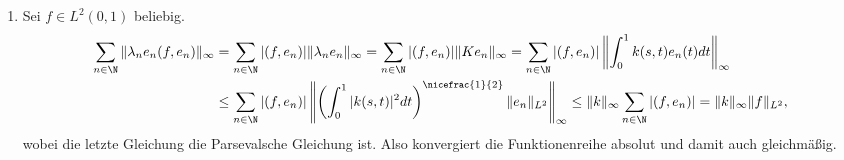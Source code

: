 \begin{solution}
\begin{enumerate}[label = (\alph*)]
  \item Sei $f \in L^2(0,1)$ beliebig.
  \begin{align*}
    \sum_{n \in \N}\|\lambda_n e_n (f,e_n)\|_{\infty} &=
    \sum_{n \in \N}|(f,e_n)|\|\lambda_ne_n\|_{\infty} =
    \sum_{n \in \N}|(f,e_n)|\|Ke_n\|_{\infty} =
    \sum_{n \in \N}|(f,e_n)|\left\|\int_0^1k(s,t)e_n(t)dt\right\|_{\infty} \\ &\leq
    \sum_{n \in \N}|(f,e_n)|
    \left\|\left(\int_0^1|k(s,t)|^2dt\right)^{\nicefrac{1}{2}}\|e_n\|_{L^2}\right\|_{\infty} \leq
    \|k\|_{\infty}\sum_{n \in \N}|(f,e_n)| = \|k\|_{\infty}\|f\|_{L^2},
  \end{align*}
  wobei die letzte Gleichung die Parsevalsche Gleichung ist. Also konvergiert die
  Funktionenreihe absolut und damit auch gleichmäßig. \\
\end{enumerate}
\end{solution}
